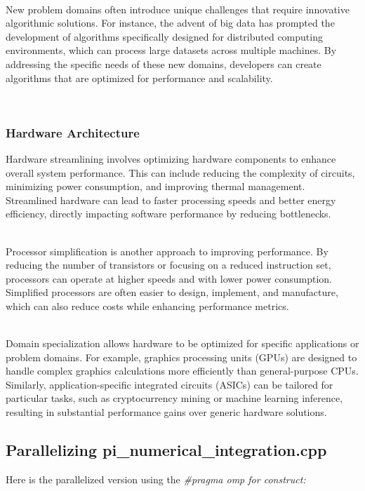 \documentclass[../../main.tex]{subfiles}
\begin{document}
    ~\\
    New problem domains often introduce unique challenges that require innovative algorithmic solutions. For instance, the advent of big data has prompted the development of algorithms specifically designed for distributed computing environments, which can process large datasets across multiple machines. By addressing the specific needs of these new domains, developers can create algorithms that are optimized for performance and scalability.

    ~\\
    \subsubsection{Hardware Architecture}
    Hardware streamlining involves optimizing hardware components to enhance overall system performance. This can include reducing the complexity of circuits, minimizing power consumption, and improving thermal management. Streamlined hardware can lead to faster processing speeds and better energy efficiency, directly impacting software performance by reducing bottlenecks.

    ~\\
    Processor simplification is another approach to improving performance. By reducing the number of transistors or focusing on a reduced instruction set, processors can operate at higher speeds and with lower power consumption. Simplified processors are often easier to design, implement, and manufacture, which can also reduce costs while enhancing performance metrics.

    ~\\
    Domain specialization allows hardware to be optimized for specific applications or problem domains. For example, graphics processing units (GPUs) are designed to handle complex graphics calculations more efficiently than general-purpose CPUs. Similarly, application-specific integrated circuits (ASICs) can be tailored for particular tasks, such as cryptocurrency mining or machine learning inference, resulting in substantial performance gains over generic hardware solutions.

    \newpage
    \subsection{Parallelizing pi\_numerical\_integration.cpp}
    Here is the parallelized version using the \em \#pragma omp for \em construct:
\end{document}

